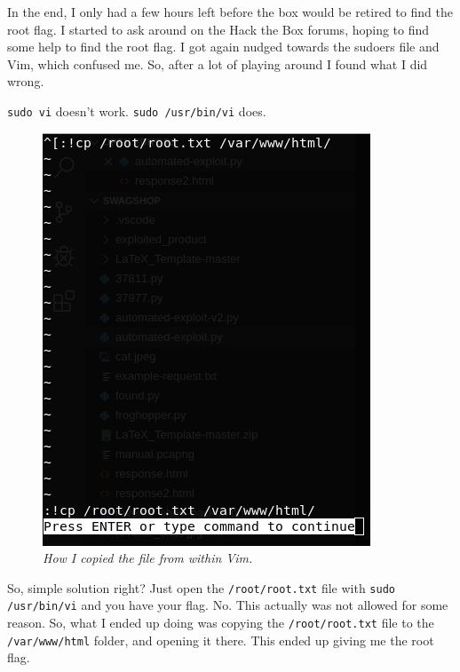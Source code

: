 In the end, I only had a few hours left before the box would be retired to find the root flag. I started to ask around on the Hack the Box forums, hoping to find some help to find the root flag. I got again nudged towards the sudoers file and Vim, which confused me. So, after a lot of playing around I found what I did wrong.

\begin{center}
    \verb|sudo vi| doesn't work. \verb|sudo /usr/bin/vi| does.
\end{center}

\begin{figure} %
	\centering
	\captionsetup{justification=centering}
	\noindent \includegraphics[width=\linewidth]{figures/root-copy-2.png}
	\caption{\emph{How I copied the file from within Vim.}}
	\label{fig:vimcopy}
\end{figure}

\vspace{2mm}

So, simple solution right? Just open the \verb|/root/root.txt| file with \verb|sudo /usr/bin/vi| and you have your flag. No. This actually was not allowed for some reason. So, what I ended up doing was copying the \verb|/root/root.txt| file to the \verb|/var/www/html| folder, and opening it there. This ended up giving me the root flag.

